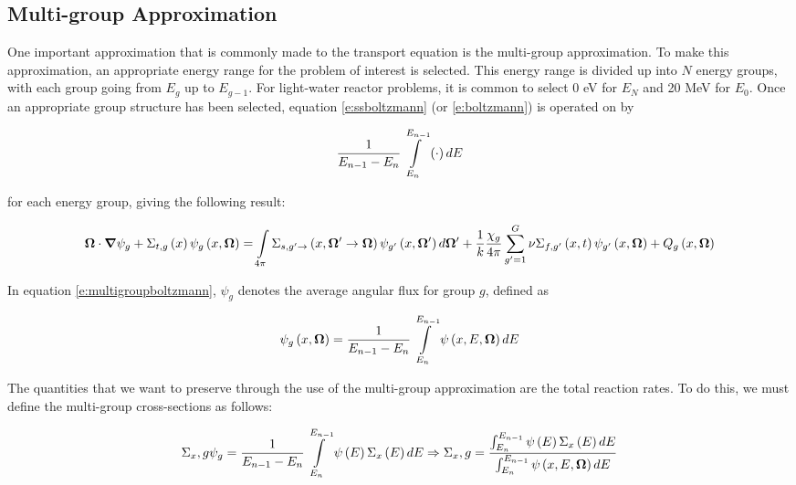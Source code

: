 \subsection{Multi-group Approximation}

One important approximation that is commonly made to the transport equation is the multi-group approximation.  To make this approximation, an appropriate energy range for the problem of interest is selected.  This energy range is divided up into $N$ energy groups, with each group going from $E_g$ up to $E_{g-1}$.  For light-water reactor problems, it is common to select 0 eV for $E_N$ and 20 MeV for $E_0$.  Once an appropriate group structure has been selected, equation \ref{e:ssboltzmann} (or \ref{e:boltzmann}) is operated on by 

\begin{equation}
\frac{1}{E_{n-1} - E_n}\intop_{E_n}^{E_{n-1}}\left(\cdot\right)dE
\end{equation}

for each energy group, giving the following result:

\begin{dmath}\label{e:multigroupboltzmann}
{\bm \Omega \cdot \bm \nabla \psi_g + \Sigma_{t,g}\left(x\right)\psi_g\left(x,\bm \Omega\right) = \intop_{4\pi} \Sigma_{s,g'\rightarrow}\left(x,\bm \Omega' \rightarrow \bm \Omega\right) \psi_{g'}\left(x,\bm \Omega'\right) d\bm \Omega'} + {\frac{1}{k}\frac{\chi_g}{4\pi} \sum_{g'=1}^{G} \nu \Sigma_{f,g'}\left(x,t\right) \psi_{g'}\left(x,\bm \Omega\right) + Q_g\left(x,\bm \Omega\right)}
\end{dmath}

In equation \ref{e:multigroupboltzmann}, $\psi_g$ denotes the average angular flux for group $g$, defined as

\begin{equation}\label{e:multigroupangflux}
\psi_g\left(x,\bm \Omega\right)=\frac{1}{E_{n-1}-E_n} \intop_{E_n}^{E_{n-1}} \psi\left(x,E,\bm\Omega\right) dE
\end{equation}

The quantities that we want to preserve through the use of the multi-group approximation are the total reaction rates.  To do this, we must define the multi-group cross-sections as follows:

\begin{equation}\label{e:multigroupXS}
\Sigma_x,g \psi_g = \frac{1}{E_{n-1}-E_n} \intop_{E_n}^{E_{n-1}} \psi\left(E\right) \Sigma_x\left(E\right) dE \Rightarrow \Sigma_x,g = \frac{\intop_{E_n}^{E_{n-1}} \psi\left(E\right) \Sigma_x\left(E\right) dE}{\intop_{E_n}^{E_{n-1}} \psi\left(x,E,\bm\Omega\right) dE}
\end{equation}

